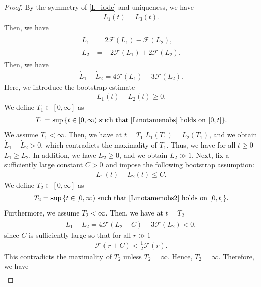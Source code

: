 \documentclass[reqno]{amsart}
\theoremstyle{plain}
\theoremstyle{definition}
\numberwithin{equation}{section}
\begin{document}
\begin{proof}
By the symmetry of \eqref{L_iode} and uniqueness, we have
\begin{align*}
L_1(t)=L_3(t).
\end{align*}
Then, we have
\begin{align}\label{L1L2ode}
\begin{aligned}
\dot{L}_1&=2\mathcal{F}(L_1)-\mathcal{F}(L_2),
\\
\dot{L}_2&=-2\mathcal{F}(L_1)+2\mathcal{F}(L_2).
\end{aligned}
\end{align}
Then, we have
\begin{align*}
\dot{L}_1-\dot{L}_2=4\mathcal{F}(L_1)-3\mathcal{F}(L_2).
\end{align*}
Here, we introduce the bootstrap estimate
\begin{align}\label{Linotamenobs}
L_1(t)-L_2(t)\geq 0.
\end{align}
We define $T_1\in [0,\infty]$ as 
\begin{align}\label{LibsnoT1}
T_1=\sup{\{t\in[0,\infty)\ \mbox{such that}\ \eqref{Linotamenobs}\ \mbox{holds on}\ [0,t] \}}.
\end{align}
We assume $T_1<\infty$. Then, we have at $t=T_1$ $L_1(T_1)=L_2(T_1)$, and we obtain $\dot{L}_1-\dot{L}_2>0$, which contradicts the maximality of $T_1$. Thus, we have for all $t\geq 0$ $L_1\geq L_2$. In addition, we have $\dot{L}_2\geq 0$, and we obtain $L_2\gg 1$. Next, fix a sufficiently large constant $C>0$ and impose the following bootstrap assumption:
\begin{align}\label{Linotamenobs2}
L_1(t)-L_2(t)\leq C.
\end{align}
We define $T_2\in [0,\infty]$ as 
\begin{align}\label{LibsnoT2}
T_2=\sup{\{t\in[0,\infty)\ \mbox{such that}\ \eqref{Linotamenobs2}\ \mbox{holds on}\ [0,t] \}}.
\end{align}
Furthermore, we assume $T_2<\infty$. Then, we have at $t=T_2$
\begin{align*}
\dot{L}_1-\dot{L}_2=4\mathcal{F}(L_2+C)-3\mathcal{F}(L_2)<0,
\end{align*}
since $C$ is sufficiently large so that for all $r\gg 1$
\begin{align*}
\mathcal{F}(r+C)<\frac{1}{2}\mathcal{F}(r).
\end{align*}
This contradicts the maximality of $T_2$ unless $T_2=\infty$. Hence, $T_2=\infty$. Therefore, we have
\begin{align}\label{L1L2sasim}

\end{align}
\end{proof}
\end{document}
